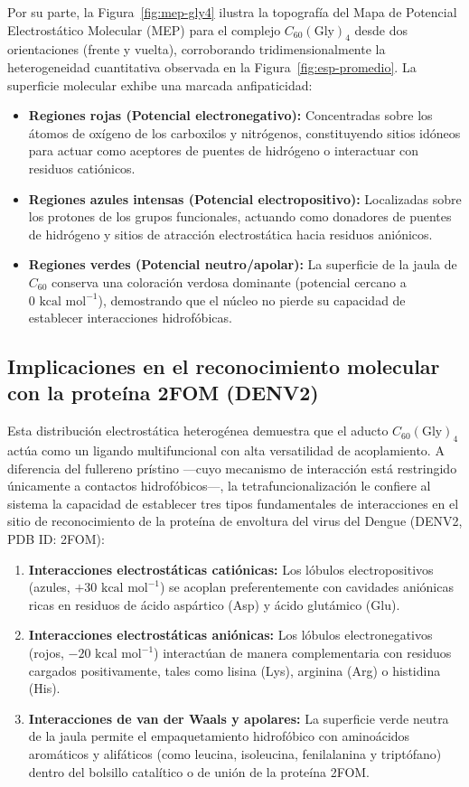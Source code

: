 Por su parte, la Figura~\ref{fig:mep-gly4} ilustra la topografía del Mapa de Potencial Electrostático Molecular (MEP) para el complejo $C_{60}(\text{Gly})_4$ desde dos orientaciones (frente y vuelta), corroborando tridimensionalmente la heterogeneidad cuantitativa observada en la Figura~\ref{fig:esp-promedio}. La superficie molecular exhibe una marcada anfipaticidad:
\begin{itemize}
    \item \textbf{Regiones rojas (Potencial electronegativo):} Concentradas sobre los átomos de oxígeno de los carboxilos y nitrógenos, constituyendo sitios idóneos para actuar como aceptores de puentes de hidrógeno o interactuar con residuos catiónicos.
    \item \textbf{Regiones azules intensas (Potencial electropositivo):} Localizadas sobre los protones de los grupos funcionales, actuando como donadores de puentes de hidrógeno y sitios de atracción electrostática hacia residuos aniónicos.
    \item \textbf{Regiones verdes (Potencial neutro/apolar):} La superficie de la jaula de $C_{60}$ conserva una coloración verdosa dominante (potencial cercano a $0\text{ kcal mol}^{-1}$), demostrando que el núcleo no pierde su capacidad de establecer interacciones hidrofóbicas.
\end{itemize}

\subsection{Implicaciones en el reconocimiento molecular con la proteína 2FOM (DENV2)}

Esta distribución electrostática heterogénea demuestra que el aducto $C_{60}(\text{Gly})_4$ actúa como un ligando multifuncional con alta versatilidad de acoplamiento. A diferencia del fullereno prístino —cuyo mecanismo de interacción está restringido únicamente a contactos hidrofóbicos—, la tetrafuncionalización le confiere al sistema la capacidad de establecer tres tipos fundamentales de interacciones en el sitio de reconocimiento de la proteína de envoltura del virus del Dengue (DENV2, PDB ID: 2FOM):
\begin{enumerate}
    \item \textbf{Interacciones electrostáticas catiónicas:} Los lóbulos electropositivos (azules, $+30\text{ kcal mol}^{-1}$) se acoplan preferentemente con cavidades aniónicas ricas en residuos de ácido aspártico (Asp) y ácido glutámico (Glu).
    \item \textbf{Interacciones electrostáticas aniónicas:} Los lóbulos electronegativos (rojos, $-20\text{ kcal mol}^{-1}$) interactúan de manera complementaria con residuos cargados positivamente, tales como lisina (Lys), arginina (Arg) o histidina (His).
    \item \textbf{Interacciones de van der Waals y apolares:} La superficie verde neutra de la jaula permite el empaquetamiento hidrofóbico con aminoácidos aromáticos y alifáticos (como leucina, isoleucina, fenilalanina y triptófano) dentro del bolsillo catalítico o de unión de la proteína 2FOM.
\end{enumerate}

